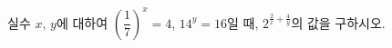 실수 $x$, $y$에 대하여 $\left(\dfrac{1}{7}\right)^{x}=4$, $14^y=16$일 때, $2^{\frac{2}{x}+\frac{4}{y}}$의 값을 구하시오.
